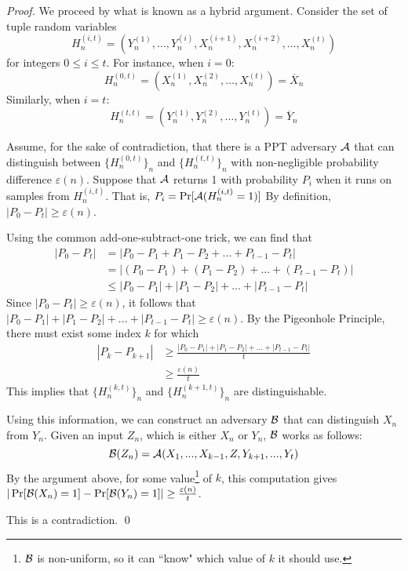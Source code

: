 \begin{proof}
We proceed by what is known as a hybrid argument.
Consider the set of tuple random variables
$$H^{(i,t)}_n = (Y_n^{(1)},\hdots,Y_n^{(i)},X_n^{(i+1)},X_n^{(i+2)},\hdots,X_n^{(t)})$$
for integers $0\le i\le t$. 
For instance, when $i=0$:
$$H^{(0,t)}_n = (X_n^{(1)},X_n^{(2)},\hdots,X_n^{(t)}) = \overline{X}_n$$
Similarly, when $i=t$:
$$H^{(t,t)}_n = (Y_n^{(1)},Y_n^{(2)},\hdots,Y_n^{(t)}) = \overline{Y}_n$$

Assume, for the sake of contradiction, that there is a PPT adversary $\mathcal{A}$ that can distinguish between $\{H^{(0,t)}_n\}_n$ and $\{H^{(t,t)}_n\}_n$ with non-negligible probability difference $\varepsilon(n)$. Suppose that $\mathcal{A}$ returns 1 with probability $P_i$ when it runs on samples from $H^{(i,t)}_n$. 
That is, $P_i = \Pr[\mathcal{A}(H^{(i,t)}_n = 1)]$
By definition, $|P_0 - P_t|\ge \varepsilon(n)$. 

Using the common add-one-subtract-one trick, we can find that
\begin{align*}
|P_0 - P_t| &= |P_0 - P_{1} + P_{1} - P_{2} + ... + P_{t-1} - P_{t}| \\
&= |(P_0 - P_{1}) + (P_{1} - P_{2}) + ... + (P_{t-1} - P_{t})| \\
&\leq  |P_0 - P_{1}| + |P_{1} - P_{2}| + ... + |P_{t-1} - P_{t}|
\end{align*}
Since $|P_0 - P_t| \ge \varepsilon(n)$, it follows that $|P_0 - P_{1}| + |P_{1} - P_{2}| + ... + |P_{t-1} - P_{t}| \ge \varepsilon(n)$.
By the Pigeonhole Principle, there must exist some index $k$ for which
\begin{align*}
|P_k - P_{k+1}| &\ge \frac{|P_0 - P_{1}| + |P_{1} - P_{2}| + ... + |P_{t-1} - P_{t}|}{t} \\
&\geq \frac{\varepsilon(n)}{t}
\end{align*}
This implies that $\{H^{(k,t)}_n\}_n$ and $\{H^{(k+1,t)}_n\}_n$ are distinguishable.

Using this information, we can construct an adversary $\mathcal{B}$ that can distinguish $X_n$ from $Y_n$.
Given an input $Z_n$, which is either $X_n$ or $Y_n$, $\mathcal{B}$ works as follows:
$$\mathcal{B}(Z_n) = \mathcal{A}(X_1, ..., X_{k-1}, Z, Y_{k+1}, ..., Y_t)$$
By the argument above, for some value\footnote{$\mathcal{B}$ is non-uniform, so it can ``know" which value of $k$ it should use.} of $k$, this computation gives $|\Pr[\mathcal{B}(X_n)=1] - \Pr[\mathcal{B}(Y_n) = 1]| \ge \frac{\varepsilon(n)}{t}$.


This is a contradiction. 
\qed


\end{proof}
